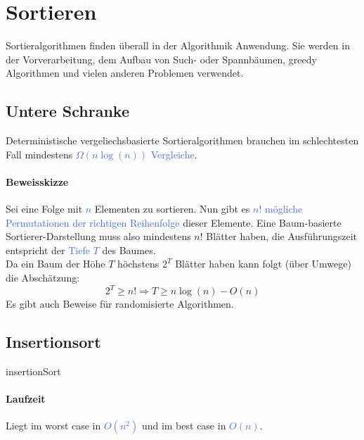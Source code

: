 \documentclass[11pt]{article}
\def \texcol{RoyalBlue}
\begin{document}
\section{Sortieren}
Sortieralgorithmen finden überall in der Algorithmik Anwendung. Sie werden in der Vorverarbeitung, dem Aufbau von Such- oder Spannbäumen, greedy Algorithmen und vielen anderen Problemen verwendet.

\subsection{Untere Schranke}
Deterministische vergeliechsbasierte Sortieralgorithmen brauchen im schlechtesten Fall mindestens \textcolor{\texcol}{$\Omega (n\log(n))$ Vergleiche}.

\paragraph{Beweisskizze}
Sei eine Folge mit \textcolor{\texcol}{$n$} Elementen zu sortieren. Nun gibt es \textcolor{\texcol}{$n!$ mögliche Permutationen der richtigen Reihenfolge} dieser Elemente. Eine Baum-basierte Sortierer-Darstellung muss also mindestens $n!$ Blätter haben, die Ausführungszeit entspricht der \textcolor{\texcol}{Tiefe $T$} des Baumes.\\
Da ein Baum der Höhe $T$ höchstens $2^T$ Blätter haben kann folgt (über Umwege) die Abschätzung:
\[
2^T \geq n! \Longrightarrow T \geq n\log(n) - O(n)
\]
Es gibt auch Beweise für randomisierte Algorithmen.

\subsection{Insertionsort}
\begin{algorithm}[H]
\caption{insertionSort}
{}
\end{algorithm}

\paragraph{Laufzeit}
Liegt im worst case in \textcolor{\texcol}{$O(n^2)$} und im best case in \textcolor{\texcol}{$O(n)$}.
\end{document}
